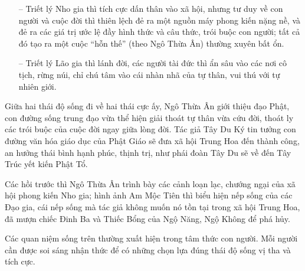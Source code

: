 \begin{itemize}
    \item[–] Triết lý Nho gia thì tích cực dấn thân vào xã hội, nhưng tư duy về con người và cuộc đời thì thiên lệch đẻ ra một nguồn máy phong kiến nặng nề, và đẻ ra các giá trị ước lệ đầy hình thức và câu thức, trói buộc con người; tất cả đó tạo ra một cuộc ``hỗn thế'' (theo Ngô Thừa Ân) thường xuyên bất ổn.

    \item[–] Triết lý Lão gia thì lánh đời, các người tài đức thì ẩn sâu vào các nơi cô tịch, rừng núi, chỉ chú tâm vào cái nhàn nhã của tự thân, vui thú với tự nhiên giới.
\end{itemize}

Giữa hai thái độ sống đi về hai thái cực ấy, Ngô Thừa Ân giới thiệu đạo Phật, con đường sống trung đạo vừa thể hiện giải thoát tự thân vừa cứu đời, thoát ly các trói buộc của cuộc đời ngay giữa lòng đời. Tác giả Tây Du Ký tin tưởng con đường văn hóa giáo dục của Phật Giáo sẽ đưa xã hội Trung Hoa đến thành công, an hưởng thái bình hạnh phúc, thịnh trị, như phái đoàn Tây Du sẽ về đến Tây Trúc yết kiến Phật Tổ.

Các hồi trước thì Ngô Thừa Ân trình bày các cảnh loạn lạc, chướng ngại của xã hội phong kiến Nho gia; hình ảnh Am Mộc Tiên thì biểu hiện nếp sống của các Đạo gia, cái nếp sống mà tác giả không muốn nó tồn tại trong xã hội Trung Hoa, đã mượn chiếc Đinh Ba và Thiếc Bổng của Ngộ Năng, Ngộ Không để phá hủy.

Các quan niệm sống trên thường xuất hiện trong tâm thức con người. Mỗi người cần được soi sáng nhận thức để có những chọn lựa đúng thái độ sống vị tha và tích cực.
